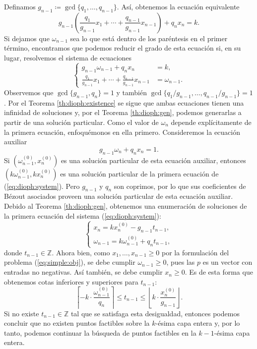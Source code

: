 \documentclass[11pt]{article}
\begin{document}
Definamos $g_{n-1} \coloneq \gcd\lbrace q_1, \ldots, q_{n-1}\rbrace$. Así, obtenemos la
ecuación equivalente
\begin{equation*}
	g_{n-1} \left(
		\frac{q_1}{g_{n-1}}x_1 + \cdots + \frac{q_{n-1}}{g_{n-1}}x_{n-1}
		\right)
	+ q_nx_n = k.
\end{equation*}
Si dejamos que $\omega_{n-1}$ sea lo que está dentro de los paréntesis en el primer término, encontramos que
podemos reducir el grado de esta ecuación si, en su lugar, resolvemos el sistema de ecuaciones
\begin{equation}
	\label{eq:dioph:system}
	\begin{cases}
		g_{n-1}\omega_{n-1} + q_nx_n &= k, \\
		\frac{q_1}{g_{n-1}}x_1 + \cdots + \frac{q_{n-1}}{g_{n-1}}x_{n-1} &= \omega_{n-1}.
	\end{cases}
\end{equation}
Observemos que $\gcd\lbrace g_{n-1}, q_n \rbrace = 1$ y también $\gcd\lbrace q_1/g_{n-1}, \ldots,
q_{n-1}/g_{n-1}\rbrace = 1$. Por el Teorema \ref{th:dioph:existence} se sigue que ambas ecuaciones
tienen una infinidad de soluciones y, por el Teorema \ref{th:dioph:gen}, podemos generarlas a partir
de una solución particular. Como el valor de $\omega_n$ depende explícitamente de la primera
ecuación, enfoquémonos en ella primero. Consideremos la ecuación auxiliar
\begin{equation}
	\label{eq:dioph:orig:aux}
	g_{n-1}\omega_n + q_nx_n = 1.
\end{equation}
Si $(\omega_{n-1}^{(0)}, x_n^{(0)})$ es una solución particular de esta ecuación auxiliar, entonces
$(k\omega_{n-1}^{(0)}, kx_n^{(0)})$ es una solución particular de la primera ecuación de
(\ref{eq:dioph:system}). Pero $g_{n-1}$ y $q_n$ son coprimos, por lo que sus coeficientes de Bézout
asociados proveen una solución particular de esta ecuación auxiliar. Debido al Teorema
\ref{th:dioph:gen}, obtenemos una enumeración de soluciones de la primera ecuación del sistema
(\ref{eq:dioph:system}):
\begin{equation*}
	\begin{cases}
		x_n = kx_n^{(0)} - g_{n-1}t_{n-1}, \\
		\omega_{n-1} = k\omega_{n-1}^{(0)} + q_nt_{n-1},
	\end{cases}
\end{equation*}
donde $t_{n-1} \in \mathbb{Z}$. Ahora bien, como $x_1, \ldots, x_{n - 1} \geq 0$ por la formulación
del problema (\ref{eq:simple:obj}), se debe cumplir $\omega_{n-1} \geq 0$, pues las $p$ es un vector
con entradas no negativas. Así también, se debe cumplir $x_n \geq 0$. Es de esta forma que obtenemos
cotas inferiores y superiores para $t_{n-1}$:
\begin{equation}
	\label{eq:bounds}
	\left\lceil -k \cdot \frac{\omega_{n-1}^{(0)}}{q_n} \right\rceil
	\leq
	t_{n-1}
	\leq
	\left\lfloor k \cdot \frac{x_n^{(0)}}{g_{n-1}} \right\rfloor.
\end{equation}
Si no existe $t_{n-1} \in \mathbb{Z}$ tal que se satisfaga esta desigualdad, entonces podemos
concluir que no existen puntos factibles sobre la $k$-ésima capa entera y, por lo tanto, podemos
continuar la búsqueda de puntos factibles en la $k-1$-ésima capa entera.
\end{document}
